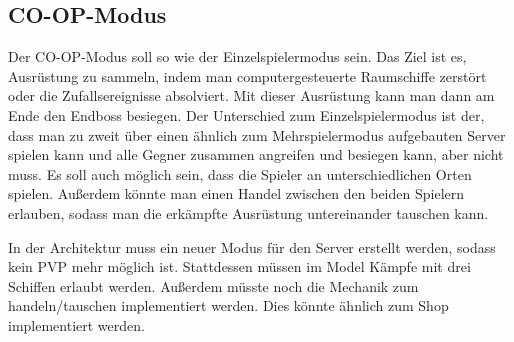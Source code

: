 \documentclass[fontsize=12pt,paper=a4,twoside]{scrartcl}
\begin{document}
\subsection{CO-OP-Modus}
{
Der CO-OP-Modus soll so wie der Einzelspielermodus sein. Das Ziel ist es, Ausrüstung zu sammeln, indem man computergesteuerte Raumschiffe zerstört oder die Zufallsereignisse absolviert. Mit dieser Ausrüstung kann man dann am Ende den Endboss besiegen. Der Unterschied zum Einzelspielermodus ist der, dass man zu zweit über einen ähnlich zum Mehrspielermodus aufgebauten Server spielen kann und alle Gegner zusammen angreifen und besiegen kann, aber nicht muss. Es soll auch möglich sein, dass die Spieler an unterschiedlichen Orten spielen. Außerdem könnte man einen Handel zwischen den beiden Spielern erlauben, sodass man die erkämpfte Ausrüstung untereinander tauschen kann.

In der Architektur muss ein neuer Modus für den Server erstellt werden, sodass kein PVP mehr möglich ist. Stattdessen müssen im Model Kämpfe mit drei Schiffen erlaubt werden. Außerdem müsste noch die Mechanik zum handeln/tauschen implementiert werden. Dies könnte ähnlich zum Shop implementiert werden.
}
\end{document}

